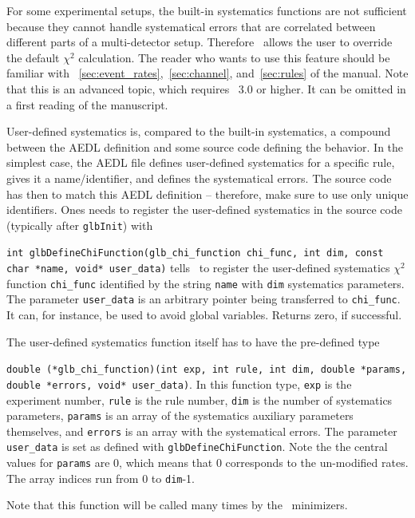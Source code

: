 For some experimental setups, the built-in systematics functions are not sufficient
because they cannot handle systematical errors that are correlated between different
parts of a multi-detector setup. Therefore \GLOBES\ allows the user
to override the default $\chi^2$ calculation. The reader who wants to use this
feature should be familiar with \Secs~\ref{sec:event_rates},~\ref{sec:channel}, and~\ref{sec:rules}
of the manual. Note that this is an advanced topic, which requires \GLOBES\ 3.0 or
higher. It can be omitted in a first reading of the manuscript.

User-defined systematics is, compared to the built-in systematics, a compound between
the AEDL definition and some source code defining the behavior. In the simplest case,
the AEDL file defines user-defined systematics for a specific rule, gives it a 
name/identifier, and defines the systematical errors. The source code has then to match this AEDL
definition -- therefore, make sure to use only unique identifiers. 
Ones needs to register the user-defined systematics in the 
source code (typically after {\tt glbInit}) with
\begin{function}
{\tt int glbDefineChiFunction(glb\_chi\_function chi\_func, int dim, const char *name, void* user\_data)}
 tells \GLOBES\ to register the user-defined systematics $\chi^2$ function {\tt chi\_func} 
identified by the string {\tt name} with {\tt dim} systematics parameters. The parameter {\tt user\_data}
is an arbitrary pointer being transferred to {\tt chi\_func}. It can, for instance, be used to avoid
global variables. Returns zero, if successful.
\end{function}
The user-defined systematics function itself has to have the pre-defined type 
\begin{function}
{\tt double (*glb\_chi\_function)(int exp, int rule, int dim, double *params, double *errors, void* user\_data)}.
In this function type, {\tt exp} is the experiment number, {\tt rule} is the rule number, {\tt dim} is the number of systematics parameters, {\tt params} is an array of the systematics auxiliary parameters themselves, and {\tt errors} is an array with the systematical errors. The parameter {\tt user\_data} is set as defined with
{\tt glbDefineChiFunction}.
Note the the central values for {\tt params} are $0$, which means that $0$ corresponds to the un-modified rates. The array indices run from $0$ to {\tt dim}-1.
\end{function}
Note that this function will be called many times by the \GLOBES\ minimizers.

